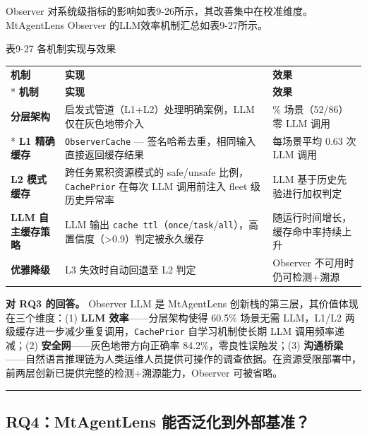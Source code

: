\documentclass[a4paper]{ctexart}
\makeatletter
\renewcommand{\_}{%
  \ifmmode
    \nfss@text{\textunderscore}%
  \else
    \textunderscore\discretionary{}{}{}%
  \fi}
\makeatother
\begin{document}
Observer 对系统级指标的影响如表9-26所示，其改善集中在校准维度。MtAgentLens Observer 的LLM效率机制汇总如表9-27所示。




\medskip
{\centering\small
表9-27 各机制实现与效果\par
\vspace{3pt}
\setlength{\tabcolsep}{6pt}
\renewcommand{\arraystretch}{1.1}
\begin{longtable}{p{4.5cm} >{\raggedright\arraybackslash}p{4.5cm} >{\raggedright\arraybackslash}p{4.5cm}}
\hline
\textbf{机制} & \textbf{实现} & \textbf{效果} \\*
\hline
\endfirsthead
\hline
\textbf{机制} & \textbf{实现} & \textbf{效果} \\
\hline
\endhead
\hline
\endfoot
\hline
\endlastfoot
\textbf{分层架构} & 启发式管道（L1+L2）处理明确案例，LLM 仅在灰色地带介入 & 60.5\% 场景（52/86）零 LLM 调用 \\*
\hline
\textbf{L1 精确缓存} & \texttt{ObserverCache} — 签名哈希去重，相同输入直接返回缓存结果 & 每场景平均 0.63 次 LLM 调用 \\
\hline
\textbf{L2 模式缓存} & 跨任务累积资源模式的 safe/unsafe 比例，\texttt{CachePrior} 在每次 LLM 调用前注入 fleet 级历史异常率 & LLM 基于历史先验进行加权判定 \\
\hline
\textbf{LLM 自主缓存策略} & LLM 输出 \texttt{cache\_ttl}（\texttt{once}/\texttt{task}/\texttt{all}），高置信度（>0.9）判定被永久缓存 & 随运行时间增长，缓存命中率持续上升 \\
\hline
\textbf{优雅降级} & L3 失效时自动回退至 L2 判定 & Observer 不可用时仍可检测+溯源 \\
\hline
\end{longtable}
\par}



\textbf{对 RQ3 的回答。} Observer LLM 是 MtAgentLens 创新栈的第三层，其价值体现在三个维度：(1) \textbf{LLM 效率}——分层架构使得 60.5\% 场景无需 LLM，L1/L2 两级缓存进一步减少重复调用，\texttt{CachePrior} 自学习机制使长期 LLM 调用频率递减；(2) \textbf{安全网}——灰色地带方向正确率 84.2\%，零良性误触发；(3) \textbf{沟通桥梁}——自然语言推理链为人类运维人员提供可操作的调查依据。在资源受限部署中，前两层创新已提供完整的检测+溯源能力，Observer 可被省略。


\bigskip
\hrule
\bigskip


\subsection{RQ4：MtAgentLens 能否泛化到外部基准？}
\end{document}
